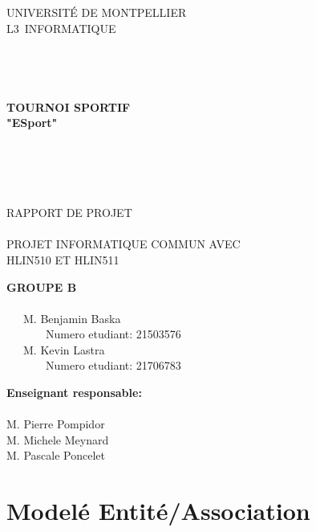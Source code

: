 \documentclass{article}
\begin{document}
\begin{center}
\linespread{2.0}\selectfont

{\Huge U}{\huge NIVERSITÉ DE }{\Huge M}{\huge ONTPELLIER}\\
{\huge L3}{\LARGE ~INFORMATIQUE }
\\~\\~\\~\\~\\
{\Large\textbf{TOURNOI SPORTIF\\"ESport"}}
\\~\\~\\~\\~\\

\linespread{1}\selectfont

RAPPORT DE PROJET\\~\\
PROJET INFORMATIQUE COMMUN AVEC\\
 HLIN510 ET HLIN511\\
\vfill
\end{center}
\begin{multicols}{2}
\begin{flushleft}
\textbf{GROUPE B}\\~\\
~~~M. Benjamin Baska\\~~~~~~~Numero etudiant: 21503576\\
~~~M. Kevin Lastra\\~~~~~~~Numero etudiant: 21706783\\
\end{flushleft}
\columnbreak
\begin{flushright}
\textbf{Enseignant responsable:}\\~\\
M. Pierre Pompidor~~~\\
M. Michele Meynard~~\\
M. Pascale Poncelet~~~
\end{flushright}
\end{multicols}
\newpage
\section{Modelé Entité/Association}
\end{document}
